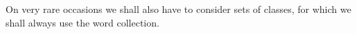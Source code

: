 On very rare occasions we shall also have to consider sets of classes, for which we shall always use the word collection.
